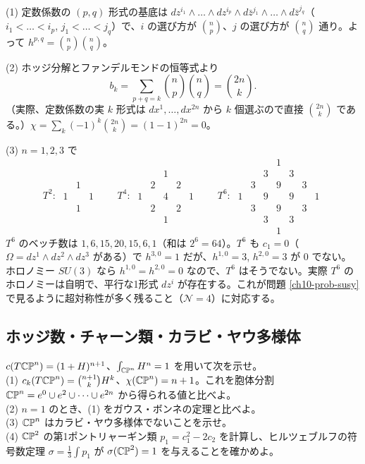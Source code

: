 \begin{solution}
(1) 定数係数の $(p,q)$ 形式の基底は $dz^{i_1}\wedge\dots\wedge dz^{i_p}\wedge d\bar z^{j_1}\wedge\dots\wedge d\bar z^{j_q}$（$i_1<\dots<i_p$, $j_1<\dots<j_q$）で、$i$ の選び方が $\binom np$、$j$ の選び方が $\binom nq$ 通り。よって $h^{p,q}=\binom np\binom nq$。

(2) ホッジ分解とファンデルモンドの恒等式より
\[
b_k=\sum_{p+q=k}\binom np\binom nq=\binom{2n}{k}.
\]
（実際、定数係数の実 $k$ 形式は $dx^1,\dots,dx^{2n}$ から $k$ 個選ぶので直接 $\binom{2n}k$ である。）$\chi=\sum_k(-1)^k\binom{2n}{k}=(1-1)^{2n}=0$。

(3) $n=1,2,3$ で
\[
T^2:\ \begin{matrix}&1&\\1&&1\\&1&\end{matrix}\qquad
T^4:\ \begin{matrix}&&1&&\\&2&&2&\\1&&4&&1\\&2&&2&\\&&1&&\end{matrix}\qquad
T^6:\ \begin{matrix}&&&1&&&\\&&3&&3&&\\&3&&9&&3&\\1&&9&&9&&1\\&3&&9&&3&\\&&3&&3&&\\&&&1&&&\end{matrix}
\]
$T^6$ のベッチ数は $1,6,15,20,15,6,1$（和は $2^6=64$）。$T^6$ も $c_1=0$（$\Omega=dz^1\wedge dz^2\wedge dz^3$ がある）で $h^{3,0}=1$ だが、$h^{1,0}=3$, $h^{2,0}=3$ が $0$ でない。ホロノミー $SU(3)$ なら $h^{1,0}=h^{2,0}=0$ なので、$T^6$ はそうでない。実際 $T^6$ のホロノミーは自明で、平行な1形式 $dz^i$ が存在する。これが問題 \ref{ch10-prob-susy} で見るように超対称性が多く残ること（$\mathcal N=4$）に対応する。
\end{solution}

\subsection{ホッジ数・チャーン類・カラビ・ヤウ多様体}

\begin{problem}[難易度 A]\label{ch10-prob-cpn}
$c(T\mathbb{CP}^n)=(1+H)^{n+1}$、$\int_{\mathbb{CP}^n}H^n=1$ を用いて次を示せ。\\
(1) $c_k(T\mathbb{CP}^n)=\binom{n+1}{k}H^k$、$\chi(\mathbb{CP}^n)=n+1$。これを胞体分割 $\mathbb{CP}^n=e^0\cup e^2\cup\dots\cup e^{2n}$ から得られる値と比べよ。\\
(2) $n=1$ のとき、(1) をガウス・ボンネの定理と比べよ。\\
(3) $\mathbb{CP}^n$ はカラビ・ヤウ多様体でないことを示せ。\\
(4) $\mathbb{CP}^2$ の第1ポントリャーギン類 $p_1=c_1^2-2c_2$ を計算し、ヒルツェブルフの符号数定理 $\sigma=\frac13\int p_1$ が $\sigma(\mathbb{CP}^2)=1$ を与えることを確かめよ。
\end{problem}

